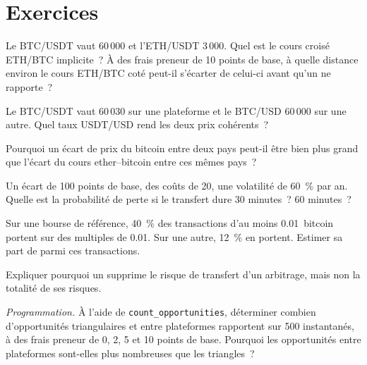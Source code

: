 \section{Exercices}

\begin{exercise}[$\star$]\label{exo:m3:spot-markets:1}
Le BTC/USDT vaut 60\,000 et l'ETH/USDT 3\,000. Quel est le cours croisé ETH/BTC implicite~? À des frais preneur de 10 points de base,
à quelle distance environ le cours ETH/BTC coté peut-il s'écarter de celui-ci avant qu'un  ne rapporte~?
\end{exercise}

\begin{exercise}[$\star$]\label{exo:m3:spot-markets:2}
Le BTC/USDT vaut 60\,030 sur une plateforme et le BTC/USD 60\,000 sur une autre. Quel taux USDT/USD rend les deux prix
cohérents~?
\end{exercise}

\begin{exercise}[$\star$]\label{exo:m3:spot-markets:3}
Pourquoi un écart de prix du bitcoin entre deux pays peut-il être bien plus grand que l'écart du cours ether--bitcoin entre
ces mêmes pays~?
\end{exercise}

\begin{exercise}[$\star\star$]\label{exo:m3:spot-markets:4}
Un écart de 100 points de base, des coûts de 20, une volatilité de 60~\% par an. Quelle est la probabilité de perte si le transfert
dure 30 minutes~? 60 minutes~?
\end{exercise}

\begin{exercise}[$\star\star$]\label{exo:m3:spot-markets:5}
Sur une bourse de référence, 40~\% des transactions d'au moins 0.01~bitcoin portent sur des multiples de 0.01. Sur une autre, 12~\% en portent.
Estimer sa part de  parmi ces transactions.
\end{exercise}

\begin{exercise}[$\star\star$]\label{exo:m3:spot-markets:6}
Expliquer pourquoi un  supprime le risque de transfert d'un arbitrage, mais non la totalité de ses risques.
\end{exercise}

\begin{exercise}[$\star\star\star$]\label{exo:m3:spot-markets:7}
\emph{Programmation.} À l'aide de \texttt{count\_opportunities}, déterminer combien d'opportunités triangulaires et entre plateformes rapportent sur 500
instantanés, à des frais preneur de 0, 2, 5 et 10 points de base. Pourquoi les opportunités entre plateformes sont-elles plus nombreuses que les triangles~?
\end{exercise}


